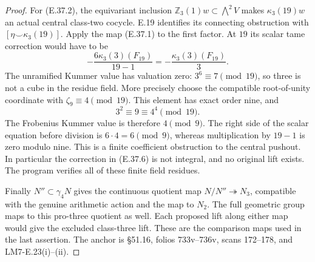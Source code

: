 \documentclass[11pt,oneside]{article}
\begin{document}
\begin{proof}
For (E.37.2), the equivariant inclusion
$\mathbb Z_3(1)w\subset\bigwedge^2V$
makes $\kappa_3(19)w$ an actual central
class-two cocycle. E.19 identifies its
connecting obstruction with
$[\eta\smile\kappa_3(19)]$.
Apply the map (E.37.1) to the first
factor. At $19$ its scalar tame
correction would have to be
\[
       -\frac{6\kappa_3(3)(F_{19})}{19-1}
          =-\frac{\kappa_3(3)(F_{19})}{3}.
 \tag{E.37.6}
\]
The unramified Kummer value has valuation
zero: $3^6\equiv7\pmod{19}$, so three
is not a cube in the residue field.
More precisely choose the compatible
root-of-unity coordinate with
$\zeta_9\equiv4\pmod{19}$. This element
has exact order nine, and
\[
         3^2\equiv9\equiv4^4\pmod{19}.
\]
The Frobenius Kummer value is therefore
$4\pmod9$. The right side of the scalar
equation before division is
$6\cdot4=6\pmod9$, whereas multiplication
by $19-1$ is zero modulo nine.
This is a finite coefficient obstruction
to the central pushout. In particular
the correction in (E.37.6) is not
integral, and no original lift exists.
The program verifies all of these finite
field residues.

Finally $N''\subset\gamma_4N$ gives the
continuous quotient map
$N/N''\twoheadrightarrow N_3$,
compatible with the genuine arithmetic
action and the map to $N_2$.
The full geometric group maps to this
pro-three quotient as well. Each proposed
lift along either map would give the
excluded class-three lift. These are
the comparison maps used in the last
assertion. The anchor is \S51.16,
folios 733v--736v, scans 172--178,
and LM7-E.23(i)--(ii).
\end{proof}
\end{document}
